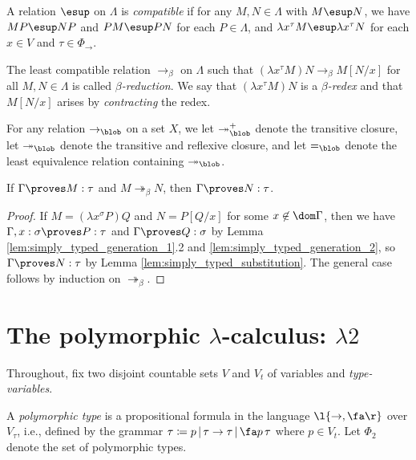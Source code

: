 \documentclass[reqno]{amsart}
\begin{document}
    \begin{definition}
        A relation $\esup$ on $\Lambda$ is \textit{compatible} if for any $M,N\in\Lambda$ with $M\esup N$, we have $MP\esup NP$ and $PM\esup PN$ for each $P\in\Lambda$, and $\lambda x^\tau M\esup\lambda x^\tau N$ for each $x\in V$ and $\tau\in\Phi_\rightarrow$.
    \end{definition}

    \begin{definition}
        The least compatible relation $\rightarrow_\beta$ on $\Lambda$ such that $(\lambda x^\tau M)N\rightarrow_\beta M[N/x]$ for all $M,N\in\Lambda$ is called \textit{$\beta$-reduction}. We say that $(\lambda x^\tau M)N$ is a \textit{$\beta$-redex} and that $M[N/x]$ arises by \textit{contracting} the redex.
    \end{definition}

    \begin{notation}
        For any relation $\rightarrow_\blob$ on a set $X$, we let $\twoheadrightarrow_\blob^+$ denote the transitive closure, let $\twoheadrightarrow_\blob$ denote the transitive and reflexive closure, and let $=_\blob$ denote the least equivalence relation containing $\twoheadrightarrow_\blob$.
    \end{notation}

    \begin{theorem}\label{thm:simply_typed_subject_reduction}
        If $\Gamma\proves M:\tau$ and $M\twoheadrightarrow_\beta N$, then $\Gamma\proves N:\tau$.
    \end{theorem}
    \begin{proof}
        If $M=(\lambda x^\sigma P)Q$ and $N=P[Q/x]$ for some $x\not\in\dom\Gamma$, then we have $\Gamma,x:\sigma\proves P:\tau$ and $\Gamma\proves Q:\sigma$ by Lemma \ref{lem:simply_typed_generation_1}.2 and \ref{lem:simply_typed_generation_2}, so $\Gamma\proves N:\tau$ by Lemma \ref{lem:simply_typed_substitution}. The general case follows by induction on $\twoheadrightarrow_\beta$.
    \end{proof}

    \section{The polymorphic $\lambda$-calculus: $\lambda2$}

    Throughout, fix two disjoint countable sets $V$ and $V_t$ of variables and \textit{type-variables}.

    \begin{definition}
        A \textit{polymorphic type} is a propositional formula in the language $\l\{\rightarrow,\fa\r\}$ over $V_\tau$, i.e., defined by the grammar $\tau\coloneqq p\,|\,\tau\rightarrow\tau\,|\,\fa p\,\tau$ where $p\in V_t$. Let $\Phi_2$ denote the set of polymorphic types.
    \end{definition}
\end{document}
